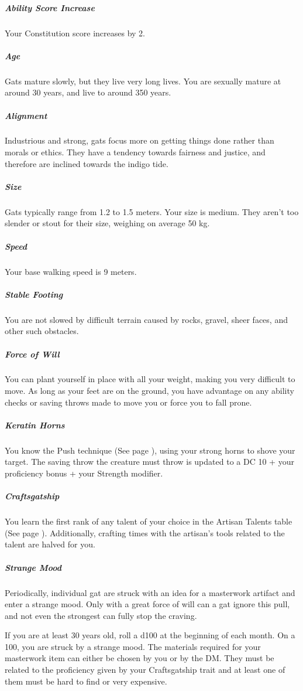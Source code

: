 \begin{linenumbers}
\subparagraph{Ability Score Increase} Your Constitution score increases by 2.

\subparagraph{Age} Gats mature slowly, but they live very long lives.
You are sexually mature at around 30 years, and live to around 350 years.

\subparagraph{Alignment} Industrious and strong, gats focus more on getting things done rather than morals or ethics.
They have a tendency towards fairness and justice, and therefore are inclined towards the indigo tide.

\subparagraph{Size} Gats typically range from 1.2 to 1.5 meters.
Your size is medium.
They aren't too slender or stout for their size, weighing on average 50 kg.

\subparagraph{Speed} Your base walking speed is 9 meters.

\subparagraph{Stable Footing} You are not slowed by difficult terrain caused by rocks, gravel, sheer faces, and other such obstacles.

\subparagraph{Force of Will} You can plant yourself in place with all your weight, making you very difficult to move.
As long as your feet are on the ground, you have advantage on any ability checks or saving throws made to move you or force you to fall prone.

\subparagraph{Keratin Horns} You know the Push technique (See page \pageref{tec::push}), using your strong horns to shove your target.
The saving throw the creature must throw is updated to a DC 10 + your proficiency bonus + your Strength modifier.

\subparagraph{Craftsgatship} You learn the first rank of any talent of your choice in the Artisan Talents table (See page \pageref{tal::artisantalents}).
Additionally, crafting times with the artisan's tools related to the talent are halved for you.


\subparagraph{Strange Mood} Periodically, individual gat are struck with an idea for a masterwork artifact and enter a strange mood.
Only with a great force of will can a gat ignore this pull, and not even the strongest can fully stop the craving.

If you are at least 30 years old, roll a d100 at the beginning of each month.
On a 100, you are struck by a strange mood.
The materials required for your masterwork item can either be chosen by you or by the DM.
They must be related to the proficiency given by your Craftsgatship trait and at least one of them must be hard to find or very expensive.


\end{linenumbers}
